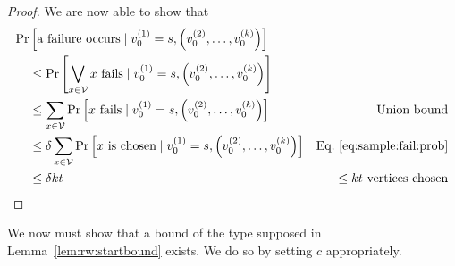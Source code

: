\documentclass{report}
\begin{document}
\begin{proof}
We are now able to show that
%
\begin{align*}
\Pr& \left [ \textnormal{a failure occurs} \mid v_0^{(1)} = s, \left (v_0^{(2)}, \dots, v_0^{(k)} \right ) \right ]
&\\
&\leq 
\Pr \left [ \bigvee_{x \in \mathcal{V}} \textnormal{$x$ fails} \mid v_0^{(1)} = s, \left (v_0^{(2)}, \dots, v_0^{(k)} \right )\right ]
&\\
&\leq
\sum_{x \in \mathcal{V}} \Pr \left [ \textnormal{$x$ fails} \mid v_0^{(1)} = s, \left (v_0^{(2)}, \dots, v_0^{(k)} \right ) \right ] 
& \textnormal{Union bound}\\
&\leq
\delta \sum_{x \in \mathcal{V}} \Pr \left [ \textnormal{$x$ is chosen} \mid v_0^{(1)} = s, \left (v_0^{(2)}, \dots, v_0^{(k)} \right ) \right ] 
& \textnormal{Eq.~\ref{eq:sample:fail:prob}}\\
&\leq
\delta kt
& \textnormal{$\leq kt$ vertices chosen}
\end{align*}
\end{proof}

We now must show that a bound of the type supposed in Lemma~\ref{lem:rw:startbound} exists.
We do so by setting $c$ appropriately. 
\end{document}
